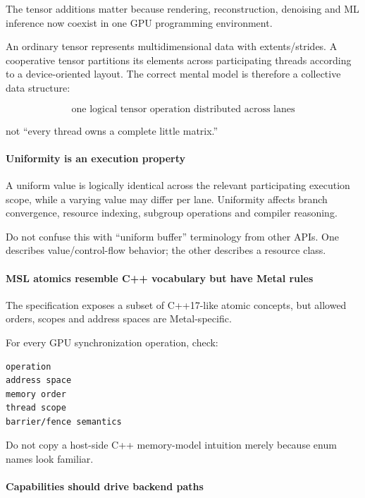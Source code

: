 The tensor additions matter because rendering, reconstruction, denoising and ML inference now coexist in one GPU programming environment.

An ordinary tensor represents multidimensional data with extents/strides. A cooperative tensor partitions its elements across participating threads according to a device-oriented layout. The correct mental model is therefore a collective data structure:

\[
\boxed{
\text{one logical tensor operation distributed across lanes}
}
\]

not ``every thread owns a complete little matrix.''

\paragraph{Uniformity is an execution property}\label{uniformity-is-an-execution-property}

A uniform value is logically identical across the relevant participating execution scope, while a varying value may differ per lane. Uniformity affects branch convergence, resource indexing, subgroup operations and compiler reasoning.

Do not confuse this with ``uniform buffer'' terminology from other APIs. One describes value/control-flow behavior; the other describes a resource class.

\paragraph{MSL atomics resemble C++ vocabulary but have Metal rules}\label{msl-atomics-resemble-c-vocabulary-but-have-metal-rules}

The specification exposes a subset of C++17-like atomic concepts, but allowed orders, scopes and address spaces are Metal-specific.

For every GPU synchronization operation, check:

\begin{verbatim}
operation
address space
memory order
thread scope
barrier/fence semantics
\end{verbatim}

Do not copy a host-side C++ memory-model intuition merely because enum names look familiar.

\paragraph{Capabilities should drive backend paths}\label{capabilities-should-drive-backend-paths}

